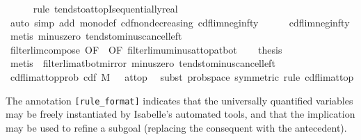 \documentclass[leqno]{article}
\theoremstyle{definition}
\begin{document}
\begin{isabellebody}
\ \ \ \ \isamarkupfalse%
\ {\isacharparenleft}rule\ tendsto{\isacharunderscore}at{\isacharunderscore}topI{\isacharunderscore}sequentially{\isacharunderscore}real{\isacharparenright}\isanewline
\ \ \ \ \isamarkupfalse%
\ {\isacharparenleft}auto\ simp\ add{\isacharcolon}\ mono{\isacharunderscore}def\ cdf{\isacharunderscore}nondecreasing\ cdf{\isacharunderscore}lim{\isacharunderscore}neg{\isacharunderscore}infty{\isacharparenright}\isanewline
\ \ \ \ \isamarkupfalse%
\ cdf{\isacharunderscore}lim{\isacharunderscore}neg{\isacharunderscore}infty\ \isamarkupfalse%
\ {\isacharparenleft}metis\ minus{\isacharunderscore}zero\ tendsto{\isacharunderscore}minus{\isacharunderscore}cancel{\isacharunderscore}left{\isacharparenright}\isanewline
\ \ \isamarkupfalse%
\ filterlim{\isacharunderscore}compose\ {\isacharbrackleft}OF\ {}{\isacharcomma}\ OF\ filterlim{\isacharunderscore}uminus{\isacharunderscore}at{\isacharunderscore}top{\isacharunderscore}at{\isacharunderscore}bot{\isacharbrackright}\isanewline
\ \ \isamarkupfalse%
\ {\isacharquery}thesis\isanewline
\ \ \ \ \isamarkupfalse%
\ {\isacharparenleft}metis\ {\isachardoublequoteopen}{}{\isachardoublequoteclose}\ filterlim{\isacharunderscore}at{\isacharunderscore}bot{\isacharunderscore}mirror\ minus{\isacharunderscore}zero\ tendsto{\isacharunderscore}minus{\isacharunderscore}cancel{\isacharunderscore}left{\isacharparenright}\isanewline
{}\isamarkupfalse%
\isanewline\isanewline%
\isamarkupfalse%
\ cdf{\isacharunderscore}lim{\isacharunderscore}at{\isacharunderscore}top{\isacharunderscore}prob{\isacharcolon}\ {\isachardoublequoteopen}{\isacharparenleft}cdf\ M\ {\isacharminus}{\isacharminus}{\isacharminus}{\isachargreater}\ {}{\isacharparenright}\ at{\isacharunderscore}top{\isachardoublequoteclose}\ \isanewline
{}\isamarkupfalse%
\ {\isacharparenleft}subst\ prob{\isacharunderscore}space\ {\isacharbrackleft}symmetric{\isacharbrackright}{\isacharcomma}\ rule\ cdf{\isacharunderscore}lim{\isacharunderscore}at{\isacharunderscore}top{\isacharparenright}%
\end{isabellebody}

\medskip

The annotation \texttt{[rule\_format]} indicates that the universally quantified variables may be freely instantiated by Isabelle's automated tools, and that the implication may be used to refine a subgoal (replacing the consequent with the antecedent). 
\end{document}
